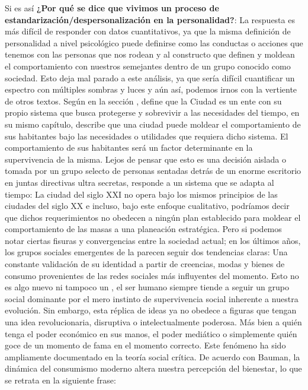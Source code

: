 Si es así \textbf{¿Por qué se dice que vivimos un proceso de estandarización/despersonalización en la personalidad?}:
La respuesta es más difícil de responder con datos cuantitativos, ya que la misma definición de personalidad a nivel
psicológico puede definirse como las conductas o acciones que tenemos con las personas que nos rodean y al constructo
que definen y moldean el comportamiento con nuestros semejantes dentro de un grupo conocido como sociedad. Esto deja mal
parado a este análisis, ya que sería difícil cuantificar un espectro con múltiples sombras y luces y aún así, podemos
irnos con la vertiente de otros textos. Según \cite{wirth_urbanismo} en la sección ,
define que la Ciudad es un ente con su propio sistema que busca protegerse y sobrevivir a las necesidades del tiempo,
en su mismo capítulo, describe que una ciudad puede moldear el comportamiento de sus habitantes bajo las necesidades o
utilidades que requiera dicho sistema. El comportamiento de sus habitantes será un factor determinante en la supervivencia
de la misma. Lejos de pensar que esto es una decisión aislada o tomada por un grupo selecto de personas sentadas detrás de
un enorme escritorio en juntas directivas ultra secretas, responde a un sistema que se adapta al tiempo: La ciudad del siglo
XXI no opera bajo los mismos principios de las ciudades del siglo XX e incluso, bajo este enfoque cualitativo, podríamos decir
que dichos requerimientos no obedecen a ningún plan establecido para moldear el comportamiento de las masas a una planeación
estratégica. Pero si podemos notar ciertas fisuras y convergencias entre la sociedad actual; en los últimos años, los grupos
sociales emergentes de la  parecen seguir dos tendencias claras: Una constante validación de su identidad
a partir de creencias, modas y bienes de consumo provenientes de las redes sociales más influyentes del momento. Esto no es algo
nuevo ni tampoco un , el ser humano siempre tiende a seguir un grupo social dominante por el mero
instinto de supervivencia social inherente a nuestra evolución. Sin embargo, esta réplica de ideas ya no obedece a figuras
que tengan una idea revolucionaria, disruptiva o intelectualmente poderosa. Más bien a quién tenga el poder económico en sus
manos, el poder mediático o simplemente quién goce de un momento de fama en el momento correcto. Este fenómeno ha sido
ampliamente documentado en la teoría social crítica. De acuerdo con Bauman, la dinámica del consumismo moderno altera
nuestra percepción del bienestar, lo que se retrata en la siguiente frase:
